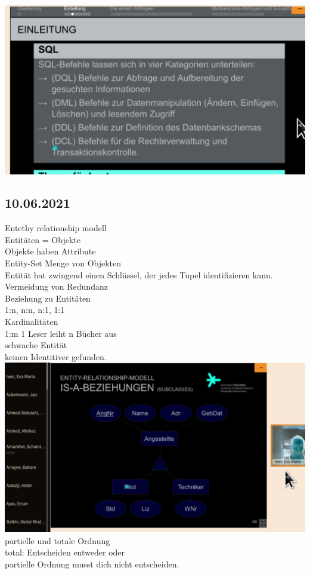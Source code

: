\documentclass{article}
\begin{document}
	\includegraphics[width=\linewidth]{lang} \\
	\subsection*{10.06.2021}
	Entethy relationship modell \\
	Entitäten = Objekte \\
	Objekte haben Attribute \\
	Entity-Set Menge von Objekten \\
	Entität hat zwingend einen Schlüssel, der jedes Tupel identifizieren kann. \\
	Vermeidung von Redundanz \\
	Beziehung zu Entitäten \\
	1:n, n:n, n:1, 1:1 \\
	Kardinalitäten \\
	1:m 1 Leser leiht n Bücher aus \\
	schwache Entität \\
	keinen Identitiver gefunden. \\
	\includegraphics[width=\linewidth]{subclass} \\
	partielle und totale Ordnung \\
	total: Entscheiden entweder oder \\
	partielle Ordnung musst dich nicht entscheiden. \\
\end{document}
